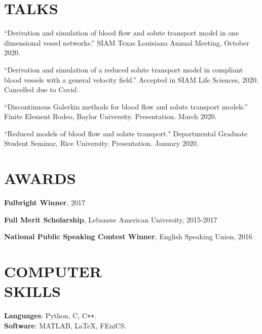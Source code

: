 \documentclass[margin]{res}
\begin{document}
\begin{resume}
\section{TALKS}
\par ``Derivation and simulation of blood flow and solute transport model in one dimensional vessel networks.'' SIAM Texas Louisiana Annual Meeting, October 2020.
\par ``Derivation and simulation of a reduced solute transport model in compliant blood vessels with a general velocity field.''  Accepted in SIAM Life Sciences, 2020. Cancelled due to Covid. 
\par 
``Discontinuous Galerkin methods for blood flow and solute transport models.'' Finite Element Rodeo, Baylor University. Presentation. March 2020.  
\par 
``Reduced models of blood flow and solute transport." Departmental Graduate Student Seminar, Rice University. Presentation. January 2020.
\section{AWARDS}
\par
\textbf{Fulbright Winner}, 2017 
\par
\textbf{Full Merit Scholarship}, Lebanese American University, 2015-2017  \par
\textbf{National Public Speaking Contest  Winner}, English Speaking Union, 2016 





\section{COMPUTER\\SKILLS}

\textbf{Languages}: Python, C, C\texttt{++}. 
\\
\textbf{Software}: MATLAB, \LaTeX, FEniCS.



\end{resume}
\end{document}
